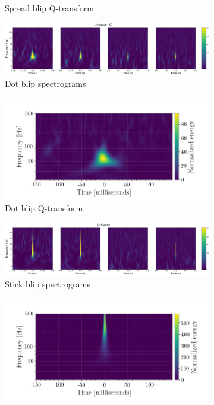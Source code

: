 \documentclass[a4paper]{article}
\begin{document}
\begin{figure}[h!]
\begin{subfigure}[t]{.29\textwidth}
		\caption{Spread blip Q-transform}
		\label{fig:spread_q}
	\end{subfigure}
	\begin{subfigure}[t]{.7\textwidth}
		\centering
		\includegraphics[width=.9\linewidth]{dot_blip_spect}
		\caption{Dot blip spectrograms}
		\label{fig:dot_s}
	\end{subfigure}
	\begin{subfigure}[t]{.29\textwidth}
		\centering
		\includegraphics[width=1.1\linewidth]{dot_blip}
		\caption{Dot blip Q-transform}
		\label{fig:dot_q}
	\end{subfigure}
	\begin{subfigure}[t]{.7\textwidth}
		\centering
		\includegraphics[width=.9\linewidth]{stick_blip_spect}
		\caption{Stick blip spectrograms}
		\label{fig:stick_s}
	\end{subfigure}
	\begin{subfigure}[t]{.29\textwidth}
		\centering
		\includegraphics[width=1.1\linewidth]{stick_blip}

\end{subfigure}
\end{figure}
\end{document}
